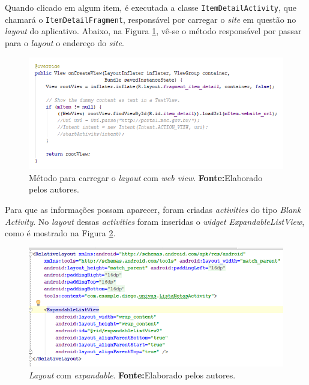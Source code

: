 	\par Quando clicado em algum item, é executada a classe
\texttt{ItemDetailActivity}, que chamará o \texttt{ItemDetailFragment},
responsável por carregar o \textit{site} em questão no \textit{layout} do
aplicativo. Abaixo, na Figura \ref{fig:qm6}, vê-se o método responsável por
passar para o \textit{layout} o endereço do \textit{site}.
				
		\begin{figure}[h!]
			\centerline{\includegraphics[scale=0.5]{./imagens/2_q_metodologico/qm6.png}}
			\caption[Método para carregar o \textit{layout} com \textit{web
			view}]{Método para carregar o \textit{layout} com \textit{web
			view}.
			 \textbf{Fonte:}Elaborado pelos autores.}
			\label{fig:qm6}
			
		\end{figure}
		
	\par Para que as informações possam aparecer, foram criadas
\textit{activities} do tipo \textit{Blank Activity}. No \textit{layout} dessas
\textit{activities} foram inseridas o \textit{widget ExpandableListView}, como
	é mostrado na Figura \ref{fig:qm7}.
	
	\begin{figure}[h!]
			\centerline{\includegraphics[scale=0.5]{./imagens/2_q_metodologico/qm7.png}}
			\caption[\textit{Layout} com \textit{expandable}]{\textit{Layout} com
			\textit{expandable}.
			 \textbf{Fonte:}Elaborado pelos autores.}
			\label{fig:qm7}
		\end{figure}			
		
